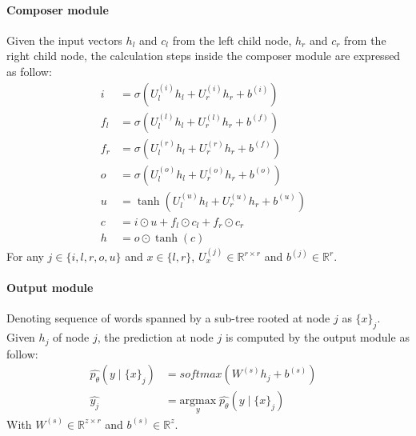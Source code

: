 \paragraph{Composer module}
Given the input vectors \({h_l}\) and \({c_l}\) from the left child node, \({h_r}\) and \({c_r}\) from the right child node, the calculation steps inside the composer module are expressed as follow:
\begin{align}
i &= \sigma{ \left(U_l^{(i)} h_{l} + U_r^{(i)} h_{r} + b^{(i)} \right) } &\\
f_{l} &= \sigma{\left(U_{l}^{(l)} h_{l} + U_{r}^{(l)} h_{r} + b^{(f)}\right)} & \\
f_{r} &= \sigma{\left(U_{l}^{(r)} h_{l} + U_{r}^{(r)} h_{r} + b^{(f)}\right)} & \\
o &= \sigma{\left( U_l^{(o)} h_{l} + U_r^{(o)} h_{r} + b^{(o)}\right)} &\\
u &= \tanh{\left( U_l^{(u)} h_{l} + U_r^{(u)} h_{r} + b^{(u)}\right)} &\\
c &= i \odot u + f_{l} \odot c_{l} + f_{r} \odot c_{r} & \\
h &= o \odot \tanh{\left(c\right)} &
\end{align}
For any \(j \in \{i, l, r, o, u\}\) and \(x \in \{l, r\}\), \(U_x^{(j)} \in \mathbb{R}^{r \times r}\) and \( b^{(j)} \in \mathbb{R}^r\).

\paragraph{Output module}
Denoting sequence of words spanned by a sub-tree rooted at node \({j}\) as \({\{x\}_j}\).
Given \({h_j}\) of node \({j}\), the prediction at node \({j}\) is computed by the output module as follow:
\begin{align}
\hat{p_{\theta}}(y \mid \{x\}_j ) &= softmax( W^{(s)} h_j + b^{(s)}) & \\
\hat{y_j} &= \underset{y}{\mathrm{argmax}} \; \hat{p_{\theta}}(y \mid \{x\}_j ) &
\end{align}
With \(W^{(s)} \in \mathbb{R}^{z \times r}\) and \( b^{(s)} \in \mathbb{R}^z\).
